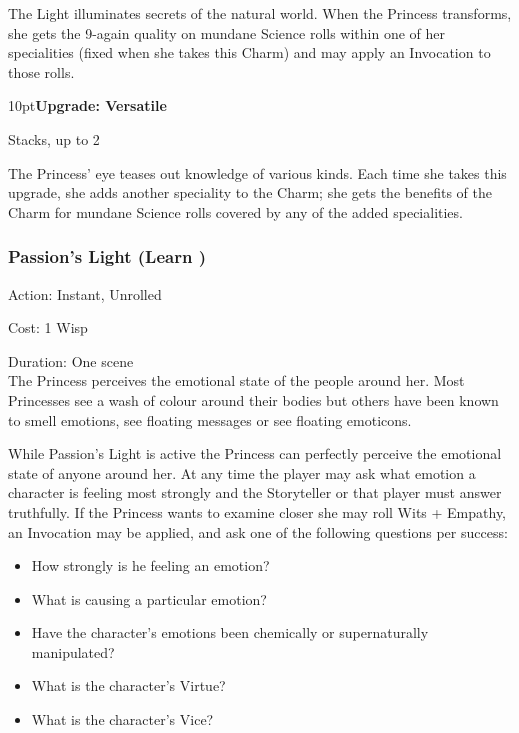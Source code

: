 \noindent The Light illuminates secrets of the natural world. When the Princess transforms, she gets the 9-again quality on mundane Science rolls within one of her specialities (fixed when she takes this Charm) and may apply an Invocation to those rolls.

\begin{myindentpar}{10pt}\textbf{Upgrade: Versatile}

Stacks, up to 2

The Princess' eye teases out knowledge of various kinds. Each time she takes this upgrade, she adds another speciality to the Charm; she gets the benefits of the Charm for mundane Science rolls covered by any of the added specialities.\end{myindentpar}

\subsubsection*{Passion's Light (Learn \textbullet)}

\noindent Action: Instant, Unrolled

\noindent Cost: 1 Wisp

\noindent Duration: One scene \\

\noindent The Princess perceives the emotional state of the people around her. Most Princesses see a wash of colour around their bodies but others have been known to smell emotions, see floating messages or see floating emoticons. 

While Passion's Light is active the Princess can perfectly perceive the emotional state of anyone around her. At any time the player may ask what emotion a character is feeling most strongly and the Storyteller or that  player must answer truthfully. If the Princess wants to examine closer she may roll Wits + Empathy, an Invocation may be applied, and ask one of the following questions per success: 

\begin{itemize}
 \item How strongly is he feeling an emotion? 
 \item What is causing a particular emotion? 
 \item Have the character’s emotions been chemically or supernaturally manipulated? 
 \item What is the character’s Virtue?
 \item What is the character’s Vice?
\end{itemize}

